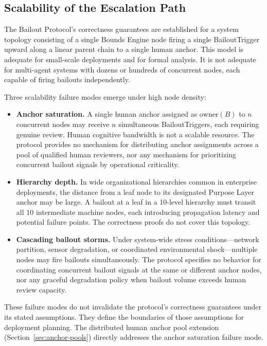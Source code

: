 \subsection{Scalability of the Escalation Path}
\label{sec:scalability}

The Bailout Protocol's correctness guarantees are established for a system topology consisting of a single Bounds Engine node firing a single BailoutTrigger upward along a linear parent chain to a single human anchor. This model is adequate for small-scale deployments and for formal analysis. It is not adequate for multi-agent systems with dozens or hundreds of concurrent nodes, each capable of firing bailouts independently.

Three scalability failure modes emerge under high node density:

\begin{itemize}\setlength\itemsep{0.25em}
\item \textbf{Anchor saturation.} A single human anchor assigned as $\text{owner}(B)$ to $n$ concurrent nodes may receive $n$ simultaneous BailoutTriggers, each requiring genuine review. Human cognitive bandwidth is not a scalable resource. The protocol provides no mechanism for distributing anchor assignments across a pool of qualified human reviewers, nor any mechanism for prioritizing concurrent bailout signals by operational criticality.
\item \textbf{Hierarchy depth.} In wide organizational hierarchies common in enterprise deployments, the distance from a leaf node to its designated Purpose Layer anchor may be large. A bailout at a leaf in a 10-level hierarchy must transit all 10 intermediate machine nodes, each introducing propagation latency and potential failure points. The correctness proofs do not cover this topology.
\item \textbf{Cascading bailout storms.} Under system-wide stress conditions---network partition, sensor degradation, or coordinated environmental shock---multiple nodes may fire bailouts simultaneously. The protocol specifies no behavior for coordinating concurrent bailout signals at the same or different anchor nodes, nor any graceful degradation policy when bailout volume exceeds human review capacity.
\end{itemize}

These failure modes do not invalidate the protocol's correctness guarantees under its stated assumptions. They define the boundaries of those assumptions for deployment planning. The distributed human anchor pool extension (Section~\ref{sec:anchor-pools}) directly addresses the anchor saturation failure mode.

